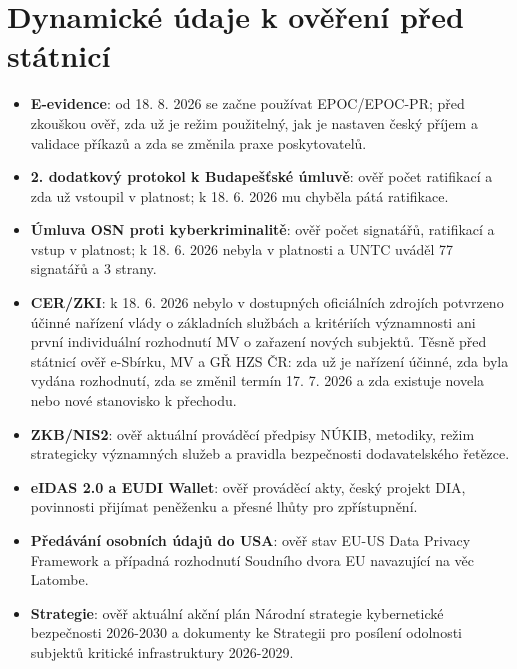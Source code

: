\section*{Dynamické údaje k ověření před státnicí}
\begin{itemize}
  \item \textbf{E-evidence}: od 18. 8. 2026 se začne používat EPOC/EPOC-PR; před zkouškou ověř, zda už je režim použitelný, jak je nastaven český příjem a validace příkazů a zda se změnila praxe poskytovatelů.
  \item \textbf{2. dodatkový protokol k Budapešťské úmluvě}: ověř počet ratifikací a zda už vstoupil v platnost; k 18. 6. 2026 mu chyběla pátá ratifikace.
  \item \textbf{Úmluva OSN proti kyberkriminalitě}: ověř počet signatářů, ratifikací a vstup v platnost; k 18. 6. 2026 nebyla v platnosti a UNTC uváděl 77 signatářů a 3 strany.
  \item \textbf{CER/ZKI}: k 18. 6. 2026 nebylo v dostupných oficiálních zdrojích potvrzeno účinné nařízení vlády o základních službách a kritériích významnosti ani první individuální rozhodnutí MV o zařazení nových subjektů. Těsně před státnicí ověř e-Sbírku, MV a GŘ HZS ČR: zda už je nařízení účinné, zda byla vydána rozhodnutí, zda se změnil termín 17. 7. 2026 a zda existuje novela nebo nové stanovisko k přechodu.
  \item \textbf{ZKB/NIS2}: ověř aktuální prováděcí předpisy NÚKIB, metodiky, režim strategicky významných služeb a pravidla bezpečnosti dodavatelského řetězce.
  \item \textbf{eIDAS 2.0 a EUDI Wallet}: ověř prováděcí akty, český projekt DIA, povinnosti přijímat peněženku a přesné lhůty pro zpřístupnění.
  \item \textbf{Předávání osobních údajů do USA}: ověř stav EU-US Data Privacy Framework a případná rozhodnutí Soudního dvora EU navazující na věc Latombe.
  \item \textbf{Strategie}: ověř aktuální akční plán Národní strategie kybernetické bezpečnosti 2026-2030 a dokumenty ke Strategii pro posílení odolnosti subjektů kritické infrastruktury 2026-2029.
\end{itemize}

